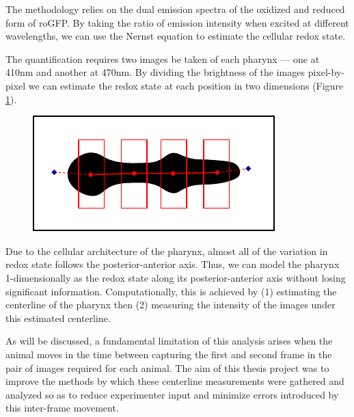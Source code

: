 The methodology relies on the dual emission spectra of the oxidized and reduced form of roGFP. By taking the ratio of emission intensity when excited at different wavelengths, we can use the Nernst equation to estimate the cellular redox state.

The quantification requires two images be taken of each pharynx --- one at 410nm and another at 470nm. By dividing the brightness of the images pixel-by-pixel we can estimate the redox state at each position in two dimensions (Figure \ref{fig:ratioImageToE}).

\begin{figure}[ht]
    \centering
    \includegraphics[scale=1.5]{Figures/rendered_files/old_midline_algorithm}
    \decoRule
    \caption[Ratios of images to redox state]{}
    \label{fig:ratioImageToE}
\end{figure}


Due to the cellular architecture of the pharynx, almost all of the variation in redox state follows the posterior-anterior axis. Thus, we can model the pharynx 1-dimensionally as the redox state along its posterior-anterior axis without losing significant information. Computationally, this is achieved by (1) estimating the centerline of the pharynx then (2) measuring the intensity of the images under this estimated centerline.

As will be discussed, a fundamental limitation of this analysis arises when the animal moves in the time between capturing the first and second frame in the pair of images required for each animal. The aim of this thesis project was to improve the methods by which these centerline measurements were gathered and analyzed so as to reduce experimenter input and minimize errors introduced by this inter-frame movement. 

